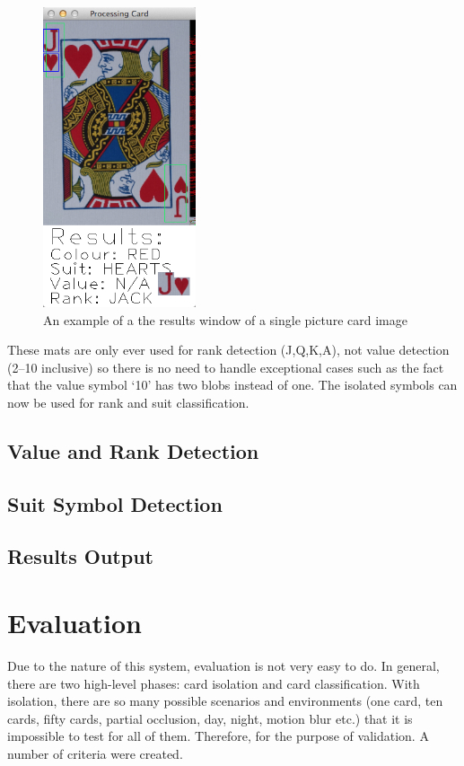 \documentclass[a4paper,12pt,notitlepage]{article}
\begin{document}
		\begin{figure}[H]
			\centering
			\includegraphics[width=0.4\textwidth]{symfind}
			\caption{An example of a the results window of a single picture card image}
			\label{fig:symfind}
		\end{figure}

		These mats are only ever used for rank detection (J,Q,K,A), not value detection (2--10 inclusive) so there is no need to handle exceptional cases such as the fact that the value symbol `10' has two blobs instead of one. The isolated symbols can now be used for rank and suit classification.
	\subsection{Value and Rank Detection}
		\label{sec:numdet}
		
	\subsection{Suit Symbol Detection}
		
	\subsection{Results Output}
		\label{sec:resultsout}
		
\pagebreak
\section{Evaluation}
	Due to the nature of this system, evaluation is not very easy to do. In general, there are two high-level phases: card isolation and card classification. With isolation, there are so many possible scenarios and environments (one card, ten cards, fifty cards, partial occlusion, day, night, motion blur etc.) that it is impossible to test for all of them. Therefore, for the purpose of validation. A number of criteria were created.
\end{document}
